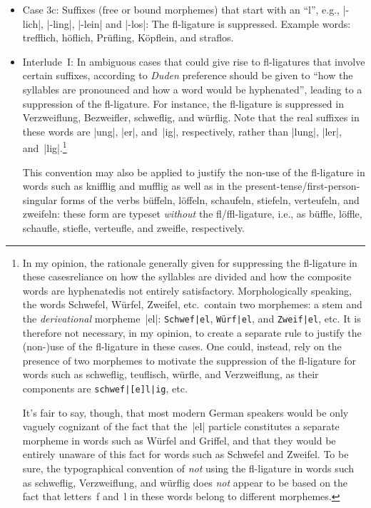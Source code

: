 \documentclass[11pt]{article}
\begin{document}
\begin{itemize}
\begin{itemize}
\item Case 3c: Suffixes (free or bound morphemes) that start with an \enquote{l}, e.g., |-lich|, |-ling|, |-lein| and |-los|: The fl-ligature is suppressed. Example words: trefflich, höflich, Prüfling, Köpflein, and s\breaklig traflos. 

\item Interlude~I: In ambiguous cases that could give rise to fl-ligatures that involve certain suffixes, according to \emph{Duden} preference should be given to \enquote{how the syllables are pronounced and how a word would be hyphenated}, leading to a suppression of the fl-ligature. For instance, the fl-ligature is suppressed in Verzweiflung, Bezweifler, schweflig, and würflig. Note that the real suffixes in these words are |ung|, |er|, and~|ig|, respectively, rather than |lung|, |ler|, and~|lig|.\footnote{%
In my opinion, the rationale generally given for suppressing the fl-ligature in these cases\textemdash reliance on how the syllables are divided and how the composite words are hyphenated\textemdash is not entirely satisfactory. Morphologically speaking, the words Schwefel, Würfel, Zweifel, etc.\ contain two morphemes: a stem and the \emph{derivational} morpheme~|el|: \Verb+Schwef|el+, \Verb+Würf|el+, and \Verb+Zweif|el+, etc. It is therefore not necessary, in my opinion, to create a separate rule to justify the (non-)use of the fl-ligature in these cases. One could, instead, rely on the presence of two morphemes to motivate the suppression of the fl-ligature for words such as schweflig, teuflisch, würfle, and Verzweiflung, as their components are \Verb+schwef|[e]l|ig+, etc. 

It's fair to say, though, that most modern German speakers would be only vaguely cognizant of the fact that the~|el| particle constitutes a separate morpheme in words such as Würfel and Griffel, and that they would be entirely unaware of this fact for words such as Schwefel and Zweifel. To be sure, the typographical convention of \emph{not} using the fl-ligature in words such as schweflig, Verzweiflung, and würflig does \emph{not} appear to be based on the fact that letters~f and~l in these words belong to different morphemes.}

This convention may also be applied to justify the non-use of the fl-ligature in words such as knifflig and mufflig as well as in the present-tense\slash first-person-singular forms of the verbs büffeln, löffeln, schaufeln, stiefeln, verteufeln, and zweifeln: these form are typeset \emph{without} the fl/ffl-ligature, i.e., as büffle, löffle, schaufle, stiefle, verteufle, and zweifle, respectively.


\end{itemize}
\end{itemize}
\end{document}
